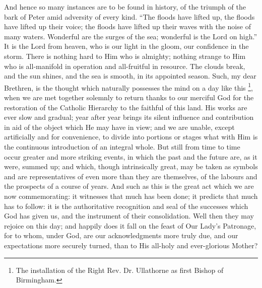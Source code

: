 And hence so many instances are to be found in
history, of the triumph of the bark of Peter amid
adversity of every kind. ``The floods have lifted up,
the floods have lifted up their voice; the floods have
lifted up their waves with the noise of many waters.
Wonderful are the surges of the sea; wonderful is the
Lord on high.'' It is the Lord from heaven, who is
our light in the gloom, our confidence in the storm.
There is nothing hard to Him who is almighty; nothing
strange to Him who is all-manifold in operation and
all-fruitful in resource. The clouds break, and the sun
shines, and the sea is smooth, in its appointed season.
Such, my dear Brethren, is the thought which naturally
possesses the mind on a day like this \footnote{The installation of the Right
Rev. Dr. Ullathorne as first Bishop of Birmingham.}, when we are met together
solemnly to return thanks to our merciful God for the
restoration of the Catholic Hierarchy to the faithful of
this land. His works are ever slow and gradual; year
after year brings its silent influence and contribution
in aid of the object which He may have in view; and we
are unable, except artificially and for convenience, to
divide into portions or stages what with Him is the
continuous introduction of an integral whole. But still
from time to time occur greater and more striking events,
in which the past and the future are, as it were, summed
up; and which, though intrinsically great, may be taken
as symbols and are representatives of even more than they
are themselves, of the labours and the prospects of a
course of years. And such as this is the great act which
we are now commemorating: it witnesses that much has been
done; it predicts that much has to follow: it is the
authoritative recognition and seal of the successes which
God has given us, and the instrument of their
consolidation. Well then they may rejoice on this day;
and happily does it fall on the feast of Our Lady's
Patronage, for to whom, under God, are our
acknowledgments more truly due, and our expectations more
securely turned, than to His all-holy and ever-glorious
Mother?

